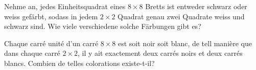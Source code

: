 Nehme an, jedes Einheitsquadrat eines $8 \times 8$ Bretts ist entweder schwarz oder weiss gefärbt, sodass in jedem $2\times 2$ Quadrat genau zwei Quadrate weiss und schwarz sind. Wie viele verschiedene solche Färbungen gibt es?

\bigskip

Chaque carré unité d'un carré $8 \times 8$ est soit noir soit blanc, de tell manière que dans chaque carré $2\times 2$, il y ait exactement deux carrés noirs et deux carrés blancs. Combien de telles colorations existe-t-il?